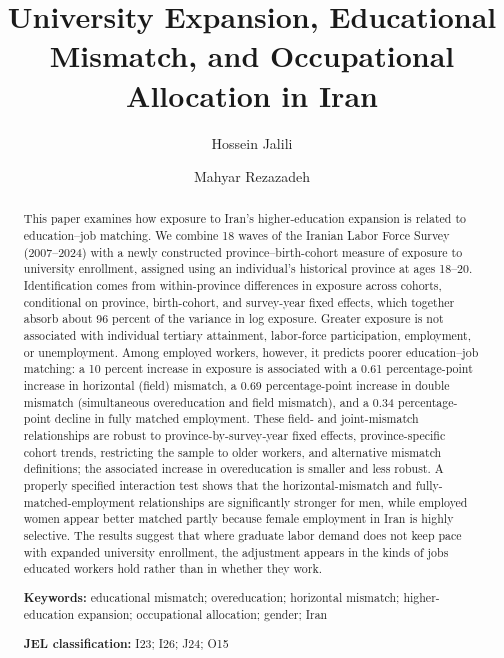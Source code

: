 \documentclass[11pt]{article}
\title{University Expansion, Educational Mismatch, and Occupational Allocation in Iran}
\author[1]{Hossein Jalili}
\author[2]{Mahyar Rezazadeh}
\affil[1,2]{Simon Fraser University}
\begin{document}
\maketitle
\begin{abstract}

This paper examines how exposure to Iran's higher-education expansion is related to education--job matching. We combine 18 waves of the Iranian Labor Force Survey (2007--2024) with a newly constructed province--birth-cohort measure of exposure to university enrollment, assigned using an individual's historical province at ages 18--20. Identification comes from within-province differences in exposure across cohorts, conditional on province, birth-cohort, and survey-year fixed effects, which together absorb about 96 percent of the variance in log exposure. Greater exposure is not associated with individual tertiary attainment, labor-force participation, employment, or unemployment. Among employed workers, however, it predicts poorer education--job matching: a 10 percent increase in exposure is associated with a 0.61 percentage-point increase in horizontal (field) mismatch, a 0.69 percentage-point increase in double mismatch (simultaneous overeducation and field mismatch), and a 0.34 percentage-point decline in fully matched employment. These field- and joint-mismatch relationships are robust to province-by-survey-year fixed effects, province-specific cohort trends, restricting the sample to older workers, and alternative mismatch definitions; the associated increase in overeducation is smaller and less robust. A properly specified interaction test shows that the horizontal-mismatch and fully-matched-employment relationships are significantly stronger for men, while employed women appear better matched partly because female employment in Iran is highly selective. The results suggest that where graduate labor demand does not keep pace with expanded university enrollment, the adjustment appears in the kinds of jobs educated workers hold rather than in whether they work.

\medskip
\noindent\textbf{Keywords:} educational mismatch; overeducation; horizontal mismatch; higher-education expansion; occupational allocation; gender; Iran

\smallskip
\noindent\textbf{JEL classification:} I23; I26; J24; O15




\end{abstract}
\end{document}
